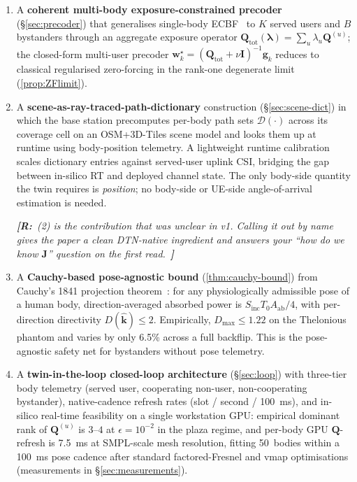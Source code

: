 \documentclass[journal,twocolumn,10pt]{IEEEtran}
\theoremstyle{definition}
\newcommand{\robinnote}[1]{%
  {\color{red!75!black}\textit{\textbf{[R:}~#1~\textbf{]}}}}
\newcommand{\khat}{\hat{\bm{k}}}
\newcommand{\ww}{\mathbf{w}}
\newcommand{\ident}{\mathbf{I}}
\newcommand{\Sinc}{S_{\mathrm{inc}}}
\newcommand{\Q}{\mathbf{Q}}
\newcommand{\Jmat}{\mathbf{J}}
\newcommand{\Aab}{A_{\mathrm{ab}}}
\newcommand{\Dict}{\mathcal{D}}
\begin{document}
\begin{enumerate}
\item
A \textbf{coherent multi-body exposure-constrained precoder}
(\S\ref{sec:precoder}) that generalises single-body
ECBF~\cite{Hochwald2014,Hochwald2019,Ying2015} to $K$ served users
and $B$ bystanders through an aggregate exposure operator
$\Q_{\mathrm{tot}}(\bm\lambda)=\sum_u\lambda_u\Q^{(u)}$; the
closed-form multi-user precoder
$\ww_k^\star=(\Q_{\mathrm{tot}}+\nu\ident)^{-1}\mathbf{g}_k$
reduces to classical regularised zero-forcing in the rank-one
degenerate limit (\cref{prop:ZFlimit}).

\item
A \textbf{scene-as-ray-traced-path-dictionary} construction
(\S\ref{sec:scene-dict}) in which the base station precomputes
per-body path sets $\Dict(\cdot)$ across its coverage cell on an
OSM+3D-Tiles scene model and looks them up at runtime using
body-position telemetry. A lightweight runtime calibration scales
dictionary entries against served-user uplink CSI, bridging the
gap between in-silico RT and deployed channel state. The only
body-side quantity the twin requires is \emph{position}; no
body-side or UE-side angle-of-arrival estimation is needed.

\robinnote{(2) is the contribution that was unclear in v1. Calling
it out by name gives the paper a clean DTN-native ingredient and
answers your ``how do we know $\Jmat$'' question on the first
read.}

\item
A \textbf{Cauchy-based pose-agnostic bound}
(\cref{thm:cauchy-bound}) from Cauchy's 1841 projection
theorem~\cite{Cauchy1841,WydaegheMonograph}: for any
physiologically admissible pose of a human body, direction-averaged
absorbed power is $\Sinc T_0 \Aab/4$, with per-direction directivity
$D(\khat)\le 2$. Empirically, $D_{\max}\le 1.22$ on the Thelonious
phantom and varies by only 6.5\% across a full backflip. This is
the pose-agnostic safety net for bystanders without pose telemetry.

\item
A \textbf{twin-in-the-loop closed-loop architecture}
(\S\ref{sec:loop}) with three-tier body telemetry (served user,
cooperating non-user, non-cooperating bystander), native-cadence
refresh rates (slot / second / 100~ms), and in-silico real-time
feasibility on a single workstation GPU: empirical dominant rank
of $\Q^{(u)}$ is $3$--$4$ at $\epsilon=10^{-2}$ in the plaza regime,
and per-body GPU $\Q$-refresh is 7.5~ms at SMPL-scale
mesh resolution, fitting 50~bodies within a 100~ms pose cadence
after standard factored-Fresnel and vmap optimisations
(measurements in \S\ref{sec:measurements}).


\end{enumerate}
\end{document}
